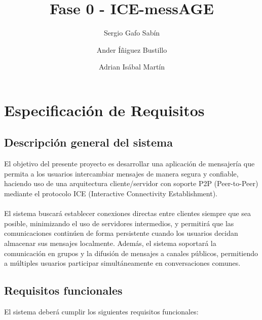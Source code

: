 \documentclass{article}
\title{Fase 0 - ICE-messAGE}
\author{Sergio Gafo Sabín \and Ander Íñiguez Bustillo \and Adrian Isábal Martín}
\begin{document}
    \maketitle %
    \newpage %
    \section{Especificación de Requisitos}

    \subsection{Descripción general del sistema}

    El objetivo del presente proyecto es desarrollar una aplicación de mensajería que permita a los usuarios intercambiar mensajes de manera segura y confiable, haciendo uso de una arquitectura cliente/servidor con soporte P2P (Peer-to-Peer) mediante el protocolo ICE (Interactive Connectivity Establishment).\\\\
El sistema buscará establecer conexiones directas entre clientes siempre que sea posible, minimizando el uso de servidores intermedios, y permitirá que las comunicaciones continúen de forma persistente cuando los usuarios decidan almacenar sus mensajes localmente. Además, el sistema soportará la comunicación en grupos y la difusión de mensajes a canales públicos, permitiendo a múltiples usuarios participar simultáneamente en conversaciones comunes.

  \subsection{Requisitos funcionales}

El sistema deberá cumplir los siguientes requisitos funcionales:
\end{document}
